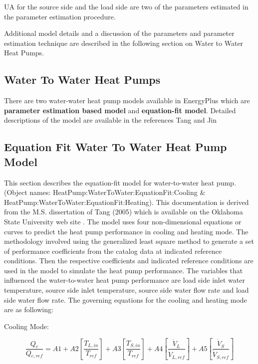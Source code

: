 UA for the source side and the load side are two of the parameters estimated in the parameter estimation procedure.

Additional model details and a discussion of the parameters and parameter estimation technique are described in the following section on Water to Water Heat Pumps.

\subsection{Water To Water Heat Pumps}\label{water-to-water-heat-pumps}

There are two water-water heat pump models available in EnergyPlus which are \textbf{parameter estimation based model} and \textbf{equation-fit model}. Detailed descriptions of the model are available in the references Tang and Jin

\subsection{Equation Fit Water To Water Heat Pump Model}\label{equation-fit-water-to-water-heat-pump-model}

This section describes the equation-fit model for water-to-water heat pump. (Object names: HeatPump:WaterToWater:EquationFit:Cooling \& HeatPump:WaterToWater:EquationFit:Heating). This documentation is derived from the M.S. dissertation of Tang (2005) which is available on the Oklahoma State University web site . The model uses four non-dimensional equations or curves to predict the heat pump performance in cooling and heating mode. The methodology involved using the generalized least square method to generate a set of performance coefficients from the catalog data at indicated reference conditions. Then the respective coefficients and indicated reference conditions are used in the model to simulate the heat pump performance. The variables that influenced the water-to-water heat pump performance are load side inlet water temperature, source side inlet temperature, source side water flow rate and load side water flow rate. The governing equations for the cooling and heating mode are as following:

Cooling Mode:

\begin{equation}
\frac{{Q{}_c}}{{Q{}_{c,ref}}} = A1 + A2\left[ {\frac{{T{}_{L,in}}}{{T{}_{ref}}}} \right] + A3\left[ {\frac{{T{}_{S,in}}}{{T{}_{ref}}}} \right] + A4\left[ {\frac{{{{\dot V}_L}}}{{{{\dot V}_{L,ref}}}}} \right] + A5\left[ {\frac{{{{\dot V}_S}}}{{{{\dot V}_{S,ref}}}}} \right]
\end{equation}

